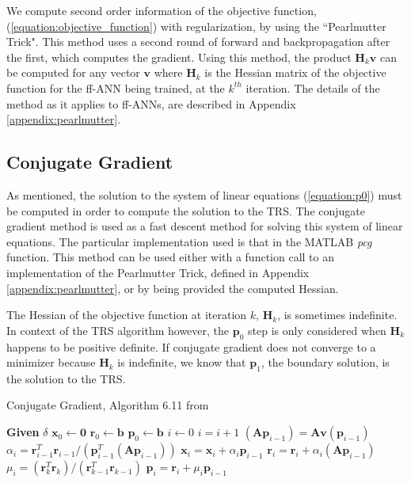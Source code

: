 \documentclass[letterpaper,12pt,titlepage,oneside,final]{book}
\begin{document}
	We compute second order information of the objective function, (\ref{equation:objective_function}) with regularization, by using the ``Pearlmutter Trick". This method uses a second round of forward and backpropagation after the first, which computes the gradient. Using this method, the product $\mathbf{H}_{k}\mathbf{v}$ can be computed for any vector $\mathbf{v}$ where $\mathbf{H}_{k}$ is the Hessian matrix of the objective function for the ff-ANN being trained, at the $k^{th}$ iteration. The details of the method as it applies to ff-ANNs, are described in Appendix \ref{appendix:pearlmutter}.
	
	\subsection{Conjugate Gradient}
	
	As mentioned, the solution to the system of linear equations (\ref{equation:p0}) must be computed in order to compute the solution to the TRS. The conjugate gradient method is used as a fast descent method for solving this system of linear equations. The particular implementation used is that in the MATLAB \textit{pcg} function. This method can be used either with a function call to an implementation of the Pearlmutter Trick, defined in Appendix \ref{appendix:pearlmutter}, or by being provided the computed Hessian.
	
	 The Hessian of the objective function at iteration $k$, $\mathbf{H}_{k}$, is sometimes indefinite. In context of the TRS algorithm however, the $\mathbf{p}_{0}$ step is only considered when $\mathbf{H}_{k}$ happens to be positive definite. If conjugate gradient does not converge to a minimizer because $\mathbf{H}_{k}$ is indefinite, we know that $\mathbf{p}_{1}$, the boundary solution, is the solution to the TRS.  
	  
	 \begin{algorithm}
	 	\caption{Conjugate Gradient, Algorithm 6.11 from \cite{demmel.book}}\label{algorithm:cg}
	 	\begin{algorithmic}[1]
	 		\State \textbf{Given} $\delta$ 
	 		\State $\mathbf{x}_{0} \gets \mathbf{0}$
	 		\State $\mathbf{r}_{0} \gets \mathbf{b}$
	 		\State $\mathbf{p}_{0} \gets \mathbf{b}$ 
	 		\State $i \gets 0$
	 		\State $i = i + 1$
	 		\State $(\mathbf{A}\mathbf{p}_{i-1}) = \mathbf{Av}(\mathbf{p}_{i-1})$
	 		\State $\alpha_{i} = \mathbf{r}^{T}_{i-1}\mathbf{r}_{i-1}/(\mathbf{p}^{T}_{i-1}(\mathbf{A}\mathbf{p}_{i-1}))$
	 		\State $\mathbf{x}_{i} = \mathbf{x}_{i} + \alpha_{i}\mathbf{p}_{i-1}$
	 		\State $\mathbf{r}_{i} = \mathbf{r}_{i} + \alpha_{i}(\mathbf{A}\mathbf{p}_{i-1})$ 
	 		\State $\mu_{i} = (\mathbf{r}^{T}_{k}\mathbf{r}_{k})/(\mathbf{r}_{k-1}^{T}\mathbf{r}_{k-1})$ 
	 		\State $\mathbf{p}_{i} = \mathbf{r}_{i} + \mu_{i}\mathbf{p}_{i-1}$
	 		\EndWhile 
	 		\EndProcedure
	 		\label{algorithm:cg}
	 	\end{algorithmic}
	 \end{algorithm}
		
\end{document}
